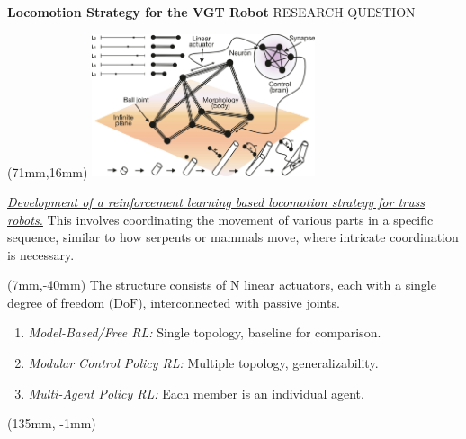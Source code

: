 \documentclass[11pt,aspectratio=169]{beamer}
\begin{document}
\begin{frame}[fragile]{\textbf{Locomotion Strategy for the VGT Robot} \hfill \fontsize{8}{8}\selectfont RESEARCH QUESTION}
    
        \begin{textblock*}{5cm}(71mm,16mm) %
        \includegraphics[height=42mm]{elements/[7]-Morphology.png}
        \end{textblock*}

         \uline{\textit{Development of a reinforcement learning based locomotion strategy for truss robots.}}
         This involves coordinating the movement of various parts in a specific sequence, similar to how serpents or mammals move, where intricate coordination is necessary.

        \bigskip
        

        \begin{textblock*}{60mm}(7mm,-40mm)
        The structure consists of $\mathrm{N}$ linear actuators, each with a single degree of freedom ($\mathrm{DoF}$), interconnected with passive joints.
        
        \begin{enumerate}
            \item \textit{Model-Based/Free RL:} Single topology, baseline for comparison.
            \item \textit{Modular Control Policy RL:} Multiple topology, generalizability.
            \item \textit{Multi-Agent Policy RL:} Each member is an individual agent.
        \end{enumerate}
        
        \end{textblock*}
        
        \begin{textblock*}{5cm}(135mm, -1mm) %
        {\tiny \cite{Lipson2000}}
        \end{textblock*}
        \vfill
 
\end{frame}
\end{document}
